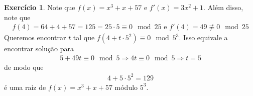 \documentclass[a4paper,12pt]{article}
\theoremstyle{definition}
\newtheorem{exercise}{Exercício}%
\begin{document}
	\begin{exercise}
		Note que $f(x) = x^3 + x + 57$ e $f'(x) = 3x^2 + 1$. Além disso, note que
		\begin{align*}
		f(4) = 64 + 4 + 57 = 125 = 25\cdot 5\equiv 0\mod 25 \text{ e } f'(4) = 49\not\equiv 0\mod 25
		\end{align*}
		Queremos encontrar $t$ tal que $f(4 + t\cdot 5^2)\equiv 0\mod 5^3$. Isso equivale a encontrar solução para
		\begin{align*}
		5 + 49t\equiv 0\mod 5 \Rightarrow 4t\equiv 0\mod 5\Rightarrow t = 5
		\end{align*}
		de modo que
		\begin{align*} 
		4 + 5\cdot 5^2 = 129
		\end{align*}
		é uma raiz de $f(x) = x^3 + x + 57$ módulo $5^3.$
	\end{exercise}
\end{document}
